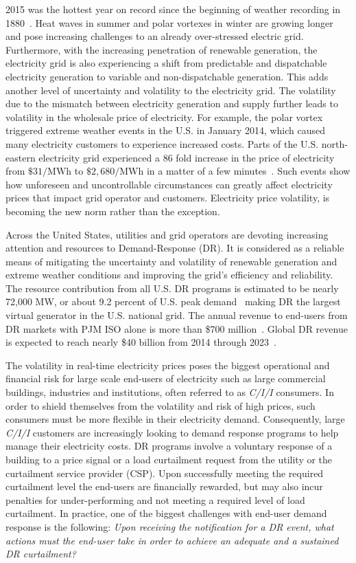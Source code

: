 2015 was the hottest year on record since the beginning of weather recording in 1880~\cite{noaa}. Heat waves in summer and polar vortexes in winter are growing longer and pose increasing challenges to an already over-stressed electric grid. Furthermore, with the increasing penetration of renewable generation, the electricity grid is also experiencing a shift from predictable and dispatchable electricity generation to variable and non-dispatchable generation. This adds another level of uncertainty and volatility to the electricity grid. The volatility due to the mismatch between electricity generation and supply further leads to volatility in the wholesale price of electricity. For example, the polar vortex triggered extreme weather events in the U.S. in January 2014, which caused many electricity customers to experience increased costs. Parts of the U.S. north-eastern electricity grid experienced a 86 fold increase in the price of electricity from $\$31/\si{\mega\watt\hour}$ to $\$2,680/\si{\mega\watt\hour}$ in a matter of a few minutes~\cite{volatility}.  Such events show how unforeseen and uncontrollable circumstances can greatly affect electricity prices that impact grid operator and customers. Electricity price volatility, is becoming the new norm rather than the exception.

Across the United States, utilities and grid operators are devoting increasing attention and resources to Demand-Response (DR). It is considered as a reliable means of mitigating the uncertainty and volatility of renewable generation and extreme weather conditions and improving the grid's efficiency and reliability. The resource contribution from all U.S. DR programs is estimated to be nearly 72,000 MW, or about 9.2 percent of U.S. peak demand~\cite{federal2008assessment} making DR the largest virtual generator in the U.S. national grid. The annual revenue to end-users from DR markets with PJM ISO alone is more than \$700 million~\cite{pjm}. Global DR revenue is expected to reach nearly \$40 billion from 2014 through 2023~\cite{navigant}.

The volatility in real-time electricity prices poses the biggest operational and financial risk for large scale end-users of electricity such as large commercial buildings, industries and institutions, often referred to as \textit{C/I/I} consumers. In order to shield themselves from the volatility and risk of high prices, such consumers must be more flexible in their electricity demand. Consequently, large \textit{C/I/I} customers are increasingly looking to demand response programs to help manage their electricity costs. DR programs involve a voluntary response of a building to a price signal or a load curtailment request from the utility or the curtailment service provider (CSP). Upon successfully meeting the required curtailment level the end-users are financially rewarded, but may also incur penalties for under-performing and not meeting a required level of load curtailment. In practice, one of the biggest challenges with end-user demand response is the following: \emph{Upon receiving the notification for a DR event, what actions must the end-user take in order to achieve an adequate and a sustained DR curtailment?} 

